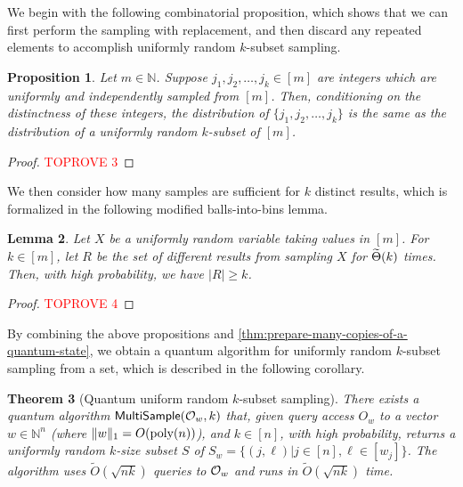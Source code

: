 \documentclass[11pt]{article}
\newtheorem{theorem}{Theorem} \newtheorem{lemma}[theorem]{Lemma} \newtheorem{proposition}[theorem]{Proposition} \newtheorem{corollary}[theorem]{Corollary} \newtheorem{definition}[theorem]{Definition} \newtheorem{conjecture}[theorem]{Conjecture} \newtheorem{claim}[theorem]{Claim} \newtheorem{fact}[theorem]{Fact}
\DeclarePairedDelimiter\rbra{\lparen}{\rparen}
\DeclarePairedDelimiter\Abs{\lVert}{\rVert}
\newcommand{\abs}[1]{\lvert #1 \rvert}
\begin{document}
{We begin with the following combinatorial proposition, 
which shows that we can first perform the sampling with replacement, 
and then discard any repeated elements to accomplish 
uniformly random $k$-subset sampling.

\begin{proposition}\label{prop:sample-with-replace-for-without-replacement}
  Let $m\in \mathbb{N}$.
  Suppose $j_1, j_2, \dots, j_k \in [m]$ are integers which are uniformly and
  independently sampled from $[m]$.
  Then, conditioning on the distinctness of these integers, the distribution of
  $\{j_1, j_2, \dots, j_k\}$ is the same as the distribution of a uniformly
  random $k$-subset of $[m]$.
\end{proposition}

\begin{proof}\textcolor{red}{TOPROVE 3}\end{proof}

We then consider how many samples
are sufficient for $k$ distinct results,
which is formalized in the following
modified balls-into-bins lemma.
\begin{lemma}\label{lemma:balls-into-bins}
  Let $X$ be a uniformly random variable 
  taking values in $[m]$. 
  For $k\in [m]$,
  let $R$ be the set of different results from sampling $X$ for
  $\widetilde{\Theta} \rbra{k}$ times. 
  Then, with high probability,
  we have 
  $\abs{R} \ge k$.
\end{lemma}

\begin{proof}\textcolor{red}{TOPROVE 4}\end{proof}

By combining the above propositions and 
\cref{thm:prepare-many-copies-of-a-quantum-state},
we obtain a quantum algorithm for
uniformly random $k$-subset sampling 
from a set,
which is described in the following corollary.

\begin{theorem}[Quantum uniform random $k$-subset  sampling]\label{thm:quantum-multiset-sample}
    There exists a quantum algorithm $\mathsf{MultiSample}(\mathcal{O}_w, k)$ that,
    given query access $O_w$ to a vector $w\in \mathbb{N}^n$
    (where $\Abs{w}_1 = O(\textup{poly}(n))$),
    and $k\in [n]$,
    with high probability,
    returns a uniformly random $k$-size subset $S$ of
    $S_w = \{(j, \ell)|j\in [n], \ell \in [w_j]\}$.
    The algorithm uses $\widetilde{O}(\sqrt{nk})$
    queries to $\mathcal{O}_w$ and runs in $\widetilde{O}(\sqrt{nk})$ time.
\end{theorem}

}
\end{document}
